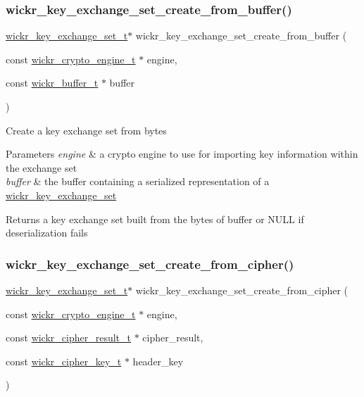 \subsubsection{\texorpdfstring{wickr\_key\_exchange\_set\_create\_from\_buffer()}{wickr\_key\_exchange\_set\_create\_from\_buffer()}}
{\footnotesize\ttfamily \mbox{\hyperlink{structwickr__key__exchange__set}{wickr\+\_\+key\+\_\+exchange\+\_\+set\+\_\+t}}$\ast$ wickr\+\_\+key\+\_\+exchange\+\_\+set\+\_\+create\+\_\+from\+\_\+buffer (\begin{DoxyParamCaption}\item[{const \mbox{\hyperlink{structwickr__crypto__engine}{wickr\+\_\+crypto\+\_\+engine\+\_\+t}} $\ast$}]{engine,  }\item[{const \mbox{\hyperlink{structwickr__buffer}{wickr\+\_\+buffer\+\_\+t}} $\ast$}]{buffer }\end{DoxyParamCaption})}

Create a key exchange set from bytes


\begin{DoxyParams}{Parameters}
{\em engine} & a crypto engine to use for importing key information within the exchange set \\
\hline
{\em buffer} & the buffer containing a serialized representation of a \textquotesingle{}\mbox{\hyperlink{structwickr__key__exchange__set}{wickr\+\_\+key\+\_\+exchange\+\_\+set}}\textquotesingle{} \\
\hline
\end{DoxyParams}
\begin{DoxyReturn}{Returns}
a key exchange set built from the bytes of \textquotesingle{}buffer\textquotesingle{} or N\+U\+LL if deserialization fails 
\end{DoxyReturn}
\mbox{\label{group__wickr__key__exchange__set_ga398eef2370517ab8b12d35a2d2475c4e}} 
\subsubsection{\texorpdfstring{wickr\_key\_exchange\_set\_create\_from\_cipher()}{wickr\_key\_exchange\_set\_create\_from\_cipher()}}
{\footnotesize\ttfamily \mbox{\hyperlink{structwickr__key__exchange__set}{wickr\+\_\+key\+\_\+exchange\+\_\+set\+\_\+t}}$\ast$ wickr\+\_\+key\+\_\+exchange\+\_\+set\+\_\+create\+\_\+from\+\_\+cipher (\begin{DoxyParamCaption}\item[{const \mbox{\hyperlink{structwickr__crypto__engine}{wickr\+\_\+crypto\+\_\+engine\+\_\+t}} $\ast$}]{engine,  }\item[{const \mbox{\hyperlink{structwickr__cipher__result}{wickr\+\_\+cipher\+\_\+result\+\_\+t}} $\ast$}]{cipher\+\_\+result,  }\item[{const \mbox{\hyperlink{structwickr__cipher__key}{wickr\+\_\+cipher\+\_\+key\+\_\+t}} $\ast$}]{header\+\_\+key }\end{DoxyParamCaption})}

